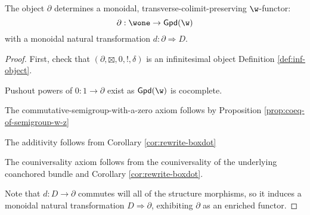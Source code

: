 \begin{theorem}%
	\label{thm:inf-gpd}
	The object $\partial$ determines a monoidal, transverse-colimit-preserving $\w$-functor:
	\[
		\partial: \wone \to \mathsf{Gpd}(\w)
	\]
	with a monoidal natural transformation $d:\partial \Rightarrow D$.
\end{theorem}
\begin{proof}
	First, check that $(\partial, \boxtimes, 0, !, \delta)$ is an infinitesimal object Definition \ref{def:inf-object}.
	\begin{enumerate}[{[{I}O.1]}]
		\item Pushout powers of $0:1 \to \partial$ exist as $\mathsf{Gpd}(\w)$ is cocomplete.
		\item The commutative-semigroup-with-a-zero axiom follows by Proposition \ref{prop:coeq-of-semigroup-w-z}
		\item The additivity follows from Corollary \ref{cor:rewrite-boxdot}
		\item The couniversality axiom follows from the couniversality of the underlying coanchored bundle and Corollary \ref{cor:rewrite-boxdot}.
	\end{enumerate}
	Note that $d: D \to \partial$ commutes will all of the structure morphisms, so it induces a monoidal natural transformation $D \Rightarrow \partial$, exhibiting $\partial$ as an enriched functor.
\end{proof}


